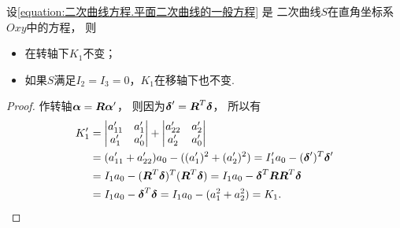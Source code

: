 \begin{theorem}
设\cref{equation:二次曲线方程.平面二次曲线的一般方程} 是
二次曲线\(S\)在直角坐标系\(Oxy\)中的方程，
则\begin{itemize}
	\item 在转轴下\(K_1\)不变；
	\item 如果\(S\)满足\(I_2 = I_3 = 0\)，\(K_1\)在移轴下也不变.
\end{itemize}
\begin{proof}
作转轴\(\boldsymbol\alpha = \boldsymbol{R} \boldsymbol\alpha'\)，
则因为\(\boldsymbol\delta' = \boldsymbol{R}^T \boldsymbol\delta\)，
所以有\begin{align*}
	K_1'
	&= \begin{vmatrix}
		a'_{11} & a'_1 \\
		a'_1 & a'_0
	\end{vmatrix}
	+ \begin{vmatrix}
		a'_{22} & a'_2 \\
		a'_2 & a'_0
	\end{vmatrix} \\
	&= (a'_{11} + a'_{22}) a_0 - ((a'_1)^2 + (a'_2)^2)
	= I_1' a_0 - (\boldsymbol\delta')^T \boldsymbol\delta' \\
	&= I_1 a_0 - (\boldsymbol{R}^T \boldsymbol\delta)^T (\boldsymbol{R}^T \boldsymbol\delta)
	= I_1 a_0 - \boldsymbol\delta^T \boldsymbol{R} \boldsymbol{R}^T \boldsymbol\delta \\
	&= I_1 a_0 - \boldsymbol\delta^T \boldsymbol\delta
	= I_1 a_0 - (a_1^2 + a_2^2)
	= K_1.
\end{align*}


\end{proof}
\end{theorem}

